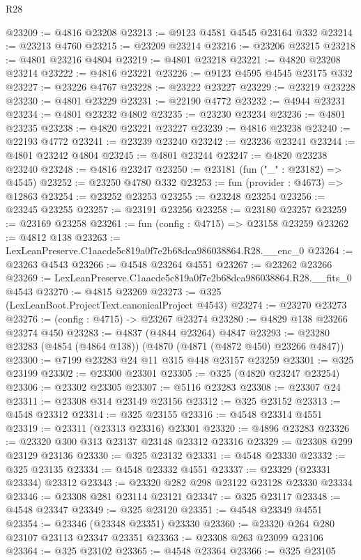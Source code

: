 \begin{lexlean}{R28}
\begin{coremodule}
@23209 := @4816 @23208
@23213 := @9123 @4581 @4545 @23164 @332
@23214 := @23213 @4760
@23215 := @23209 @23214
@23216 := @23206 @23215
@23218 := @4801 @23216 @4804
@23219 := @4801 @23218
@23221 := @4820 @23208 @23214
@23222 := @4816 @23221
@23226 := @9123 @4595 @4545 @23175 @332
@23227 := @23226 @4767
@23228 := @23222 @23227
@23229 := @23219 @23228
@23230 := @4801 @23229
@23231 := @22190 @4772
@23232 := @4944 @23231
@23234 := @4801 @23232 @4802
@23235 := @23230 @23234
@23236 := @4801 @23235
@23238 := @4820 @23221 @23227
@23239 := @4816 @23238
@23240 := @22193 @4772
@23241 := @23239 @23240
@23242 := @23236 @23241
@23244 := @4801 @23242 @4804
@23245 := @4801 @23244
@23247 := @4820 @23238 @23240
@23248 := @4816 @23247
@23250 := @23181 (fun ("_" : @23182) => @4545)
@23252 := @23250 @4780 @332
@23253 := fun (provider : @4673) => @12863
@23254 := @23252 @23253
@23255 := @23248 @23254
@23256 := @23245 @23255
@23257 := @23191 @23256
@23258 := @23180 @23257
@23259 := @23169 @23258
@23261 := fun (config : @4715) => @23158 @23259
@23262 := @4812 @138
@23263 := LexLeanPreserve.C1aacde5c819a0f7e2b68dca986038864.R28.__enc_0
@23264 := @23263 @4543
@23266 := @4548 @23264 @4551
@23267 := @23262 @23266
@23269 := LexLeanPreserve.C1aacde5c819a0f7e2b68dca986038864.R28.__fits_0 @4543
@23270 := @4815 @23269
@23273 := @325 (LexLeanBoot.ProjectText.canonicalProject @4543)
@23274 := @23270 @23273
@23276 := (config : @4715) -> @23267 @23274
@23280 := @4829 @138 @23266 @23274 @450
@23283 := @4837 (@4844 @23264) @4847
@23293 := @23280 @23283 (@4854 (@4864 @138)) (@4870 (@4871 (@4872 @450) @23266 @4847))
@23300 := @7199 @23283 @24 @11 @315 @448 @23157 @23259
@23301 := @325 @23199
@23302 := @23300 @23301
@23305 := @325 (@4820 @23247 @23254)
@23306 := @23302 @23305
@23307 := @5116 @23283
@23308 := @23307 @24
@23311 := @23308 @314 @23149 @23156
@23312 := @325 @23152
@23313 := @4548 @23312
@23314 := @325 @23155
@23316 := @4548 @23314 @4551
@23319 := @23311 (@23313 @23316) @23301
@23320 := @4896 @23283
@23326 := @23320 @300 @313 @23137 @23148 @23312 @23316
@23329 := @23308 @299 @23129 @23136
@23330 := @325 @23132
@23331 := @4548 @23330
@23332 := @325 @23135
@23334 := @4548 @23332 @4551
@23337 := @23329 (@23331 @23334) @23312
@23343 := @23320 @282 @298 @23122 @23128 @23330 @23334
@23346 := @23308 @281 @23114 @23121
@23347 := @325 @23117
@23348 := @4548 @23347
@23349 := @325 @23120
@23351 := @4548 @23349 @4551
@23354 := @23346 (@23348 @23351) @23330
@23360 := @23320 @264 @280 @23107 @23113 @23347 @23351
@23363 := @23308 @263 @23099 @23106
@23364 := @325 @23102
@23365 := @4548 @23364
@23366 := @325 @23105

\end{coremodule}
\end{lexlean}
